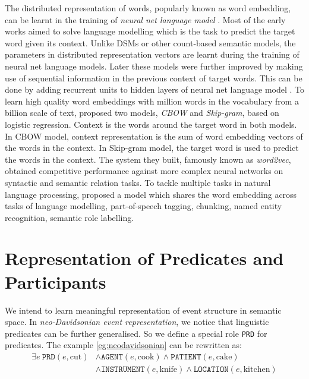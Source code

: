 \documentclass[a4paper]{article}
\begin{document}
The distributed representation of words, popularly known as word embedding, can be learnt in the training of \textit{neural net language model} \citep{bengio2003neural}. Most of the early works aimed to solve language modelling which is the task to predict the target word given its context. Unlike DSMs or other count-based semantic models, the parameters in distributed representation vectors are learnt during the training of neural net language models. Later these models were further improved by making use of sequential information in the previous context of target words. This can be done by adding recurrent units to hidden layers of neural net language model \citep{mikolov2010recurrent}. To learn high quality word embeddings with million words in the vocabulary from a billion scale of text, \citet{mikolov2013efficient} proposed two models, \textit{CBOW} and \textit{Skip-gram}, based on logistic regression. Context is the words around the target word in both models. In CBOW model, context representation is the sum of word embedding vectors of the words in the context. In Skip-gram model, the target word is used to predict the words in the context. The system they built, famously known as \textit{word2vec}, obtained competitive performance against more complex neural networks on syntactic and semantic relation tasks. To tackle multiple tasks in natural language processing, \citet{collobert2011natural} proposed a model which shares the word embedding across tasks of language modelling, part-of-speech tagging, chunking, named entity recognition, semantic role labelling. 



\newpage
\section{Representation of Predicates and Participants}
We intend to learn meaningful representation of event structure in semantic space. In \textit{neo-Davidsonian event representation}, we notice that linguistic predicates can be further generalised. So we define a special role \texttt{PRD} for predicates. The example \ref{eg:neodavidsonian} can be rewritten as: 
\begin{equation*} \label{eg:symbolic-thematic}
\begin{aligned}
    \exists e\ \texttt{PRD}(e, \text{cut})
    & \land \texttt{AGENT}(e, \text{cook}) \land \texttt{PATIENT}(e, \text{cake}) \\
    & \land \texttt{INSTRUMENT}(e, \text{knife}) \land \texttt{LOCATION}(e, \text{kitchen}) \\
\end{aligned}
\end{equation*}
\end{document}
